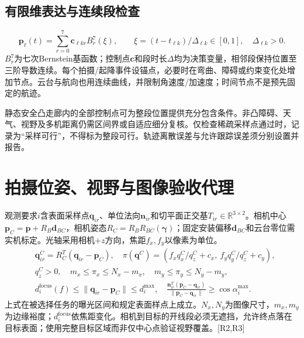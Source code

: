 \subsection{有限维表达与连续段检查}
\begin{equation}
 \mathbf p_\ell(t)=\sum_{r=0}^{7}\mathbf c_{\ell kr}B_r^7(\xi),\qquad
 \xi=(t-t_{\ell k})/\Delta_{\ell k}\in[0,1],\quad\Delta_{\ell k}>0.
 \label{eng:eq:polynomial}
\end{equation}
\noindent $B_r^7$为七次Bernstein基函数；控制点$\mathbf c$和段时长$\Delta$均为决策变量，相邻段保持位置至三阶导数连续。每个拍摄/起降事件设锚点，必要时在弯曲、障碍或约束变化处增加节点。云台与航向也用连续曲线，并限制角速度/加速度；时间节点不是预先固定的航迹。

\noindent 静态安全凸走廊内的全部控制点可为整段位置提供充分包含条件。非凸障碍、天气、视野及多机距离仍需区间界或自适应细分复核。仅检查稀疏采样点通过时，记录为“采样可行”，不得标为整段可行。轨迹离散误差与允许跟踪误差须分别设置并报告。
\clearpage

\section{拍摄位姿、视野与图像验收代理}
\noindent 观测要求$i$含表面采样点$\mathbf q_{ir}$、单位法向$\mathbf n_{ir}$和切平面正交基$T_{ir}\in\mathbb R^{3\times2}$。相机中心$\mathbf p_C=\mathbf p+R_B\mathbf d_{BC}$，相机姿态$R_C=R_BR_{BC}(\boldsymbol\gamma)$；固定安装偏移$\mathbf d_{BC}$和云台零位需实机标定。光轴采用相机$+z$方向，焦距$f_x,f_y$以像素为单位。
\begin{align}
 &\mathbf q^C_{ir}=R_C^T(\mathbf q_{ir}-\mathbf p_C),\quad
 \pi(\mathbf q^C)=\left(f_xq_x^C/q_z^C+c_x,\ f_yq_y^C/q_z^C+c_y\right),\\
 &q_z^C>0,\quad m_x\le\pi_x\le N_x-m_x,\quad
 m_y\le\pi_y\le N_y-m_y,\label{eng:eq:fov}\\
 &d_i^{\mathrm{focus}}(f)\le\|\mathbf q_{ir}-\mathbf p_C\|\le d_i^{\max},\quad
 \frac{\mathbf n_{ir}^T(\mathbf p_C-\mathbf q_{ir})}{\|\mathbf p_C-\mathbf q_{ir}\|}
 \ge\cos\alpha_i^{\max}.\label{eng:eq:viewangle}
\end{align}
\noindent 上式在被选择任务的曝光区间和规定表面样点上成立。$N_x,N_y$为图像尺寸，$m_x,m_y$为边缘裕度；$d_i^{\mathrm{focus}}$依焦距变化。相机到目标的开线段必须无遮挡，允许终点落在目标表面；使用完整目标区域而非仅中心点验证视野覆盖。[R2,R3]

